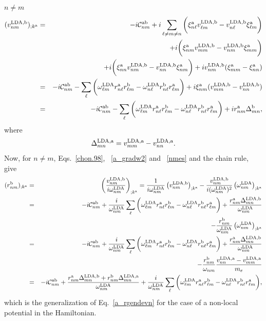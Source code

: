 \documentclass[floatfix,prb,aps,superscriptaddress,11pt,preprint]{revtex4}
\begin{document}
 $n\ne m$
\begin{eqnarray}\label{nmes}
(v^{\mathrm{LDA},\mathrm{b}}_{nm})_{;k^{\mathrm{a}}}&=&
-i{\mathbf{\cal C}}^{\mathrm{a}\mathrm{b}}_{nm}
+i
\sum_{\ell\ne m\ne n}
\bigg(
\xi^{\mathrm{a}}_{n\ell}
v^{\mathrm{LDA},\mathrm{b}}_{\ell m}
-
v^{\mathrm{LDA},\mathrm{b}}_{n\ell}
\xi^{\mathrm{a}}_{\ell m}
\bigg)
\nonumber\\
&&+
i
\bigg(
\xi^{\mathrm{a}}_{nm}
v^{\mathrm{LDA},\mathrm{b}}_{mm}
-
v^{\mathrm{LDA},\mathrm{b}}_{nm}
\xi^{\mathrm{a}}_{mm}
\bigg)
\nonumber\\
&&+
i
\bigg(
\xi^{\mathrm{a}}_{nn}
v^{\mathrm{LDA},\mathrm{b}}_{nm}
-
v^{\mathrm{LDA},\mathrm{b}}_{nn}
\xi^{\mathrm{a}}_{nm}
\bigg)
+i
v^{\mathrm{LDA},\mathrm{b}}_{nm}(\xi^{\mathrm{a}}_{mm}
-
\xi^{\mathrm{a}}_{nn}
)
\nonumber \\
&=&
-i{\mathbf{\cal C}}^{\mathrm{a}\mathrm{b}}_{nm}
-
\sum_{\ell}
\bigg(
\omega^{\mathrm{LDA}}_{\ell m}
r^{\mathrm{a}}_{n\ell}
r^{\mathrm{b}}_{\ell m}
-
\omega^{\mathrm{LDA}}_{n\ell}
r^{\mathrm{b}}_{n\ell}
r^{\mathrm{a}}_{\ell m}
\bigg)
+i
\xi^{\mathrm{a}}_{nm}
(v^{\mathrm{LDA},\mathrm{b}}_{mm}
-
v^{\mathrm{LDA},\mathrm{b}}_{nn}
)
\nonumber \\
&=&
-i{\mathbf{\cal C}}^{\mathrm{a}\mathrm{b}}_{nm}
-
\sum_{\ell}
\bigg(
\omega^{\mathrm{LDA}}_{\ell m} 
r^{\mathrm{a}}_{n\ell} 
r^{\mathrm{b}}_{\ell m}
-
\omega^{\mathrm{LDA}}_{n\ell} 
r^{\mathrm{b}}_{n\ell} 
r^{\mathrm{a}}_{\ell m}
\bigg)
+i 
r^{\mathrm{a}}_{nm}
\Delta^{\mathrm{b}}_{mn}
,
\end{eqnarray} 
where
\begin{equation}\label{na_delta}
\Delta^{\mathrm{LDA},\mathrm{a}}_{mn}=
v^{\mathrm{LDA},\mathrm{a}}_{mm}-v^{\mathrm{LDA},\mathrm{a}}_{nn}
.
\end{equation}
Now, for $n \ne m$, Eqs.~\eqref{chon.98},
~\eqref{a_gradw2} and 
~\eqref{nmes} and the chain rule, give
\begin{eqnarray}\label{na_rgendevn}
(r^{\mathrm{b}}_{nm})_{;k^{\mathrm{a}}}&=&\left(\frac{v^{\mathrm{LDA},\mathrm{b}}_{nm}}{i\omega^{\mathrm{LDA}}_{nm}}\right)_{;k^{\mathrm{a}}}
=
\frac{1}
{i\omega^{\mathrm{LDA}}_{nm}}
\left(
v^{\mathrm{LDA},\mathrm{b}}_{nm}
\right)_{;k^{\mathrm{a}}}
-
\frac{v^{\mathrm{LDA},\mathrm{b}}_{nm}}
{i(\omega^{\mathrm{LDA}}_{nm})^2}
\left(
\omega^{\mathrm{LDA}}_{nm}
\right)_{;k^{\mathrm{a}}}
\nonumber \\
&=&
-i{\mathbf{\cal C}}^{\mathrm{a}\mathrm{b}}_{nm}
+
\frac{i}{\omega^{\mathrm{LDA}}_{nm}}
\sum_{\ell}
\bigg(
\omega^{\mathrm{LDA}}_{\ell m}
r^{\mathrm{a}}_{n\ell}
r^{\mathrm{b}}_{\ell m}
-
\omega^{\mathrm{LDA}}_{n\ell}
r^{\mathrm{b}}_{n\ell}
r^{\mathrm{a}}_{\ell m}
\bigg)
+
\frac{r^{\mathrm{a}}_{nm}
\Delta^{\mathrm{LDA},\mathrm{b}}_{mn}}
{\omega^{\mathrm{LDA}}_{nm}}
\nonumber \\
&&
-
\frac{r^{\mathrm{b}}_{nm}}
{\omega^{\mathrm{LDA}}_{nm}}
\left(
\omega^{\mathrm{LDA}}_{nm}
\right)_{;k^{\mathrm{a}}}
\nonumber \\
&=&
-i{\mathbf{\cal C}}^{\mathrm{a}\mathrm{b}}_{nm}
+
\frac{i}{\omega^{\mathrm{LDA}}_{nm}}
\sum_{\ell}
\bigg(
\omega^{\mathrm{LDA}}_{\ell m}
r^{\mathrm{a}}_{n\ell}
r^{\mathrm{b}}_{\ell m}
-
\omega^{\mathrm{LDA}}_{n\ell}
r^{\mathrm{b}}_{n\ell}
r^{\mathrm{a}}_{\ell m}
\bigg)
+
\frac{r^{\mathrm{a}}_{nm}
\Delta^{\mathrm{LDA},\mathrm{b}}_{mn}}
{\omega^{\mathrm{LDA}}_{nm}}
\nonumber \\
&&
-
\frac{r^{\mathrm{b}}_{nm}}
{\omega_{nm}}
\frac{v^{\mathrm{LDA},\mathrm{a}}_{nn}-v^{\mathrm{LDA},\mathrm{a}}_{mm}}{m_e}
\nonumber \\
&=&
-i{\mathbf{\cal C}}^{\mathrm{a}\mathrm{b}}_{nm}
+
\frac{
r^{\mathrm{a}}_{nm}
\Delta^{\mathrm{LDA},\mathrm{b}}_{mn}
+r^{\mathrm{b}}_{nm}
\Delta^{\mathrm{LDA},\mathrm{a}}_{mn}
}
{\omega^{\mathrm{LDA}}_{nm}}
+
\frac{i}{\omega^{\mathrm{LDA}}_{nm}}
\sum_{\ell}
\bigg(
\omega^{\mathrm{LDA}}_{\ell m}
r^{\mathrm{a}}_{n\ell}
r^{\mathrm{b}}_{\ell m}
-
\omega^{\mathrm{LDA}}_{n\ell}
r^{\mathrm{b}}_{n\ell}
r^{\mathrm{a}}_{\ell m}
\bigg),\nonumber\\
\end{eqnarray}
which is the generalization of Eq.~\eqref{a_rgendevn} for the case of a
non-local potential in the Hamiltonian.
\end{document}
